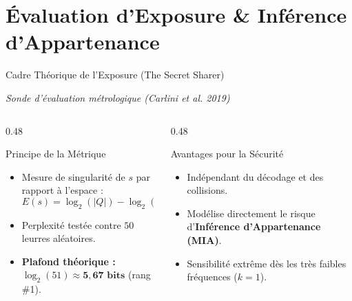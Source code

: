 \documentclass[aspectratio=169, 10pt, table]{beamer}
\newcommand{\subtitleline}[1]{{\small\itshape\color{TSPcyan}#1\par}\vspace{0.15cm}}
\begin{document}
\section{Évaluation d'Exposure \& Inférence d'Appartenance}

\begin{frame}{Cadre Théorique de l'Exposure (The Secret Sharer)}
    \subtitleline{Sonde d'évaluation métrologique (Carlini et al. 2019)}
    \begin{columns}[T]
        \begin{column}{0.48\textwidth}
            \begin{block}{Principe de la Métrique}
                \small
                \begin{itemize}
                    \item Mesure de singularité de $s$ par rapport à l'espace :
                    $$E(s) = \log_2(|Q|) - \log_2(\text{Rang}(s))$$
                    \item Perplexité testée contre $50$ leurres aléatoires.
                    \item \textbf{Plafond théorique :} $\log_2(51) \approx \mathbf{5{,}67\text{ bits}}$ (rang \#1).
                \end{itemize}
            \end{block}
        \end{column}
        \begin{column}{0.48\textwidth}
            \begin{block}{Avantages pour la Sécurité}
                \small
                \begin{itemize}
                    \item Indépendant du décodage et des collisions.
                    \item Modélise directement le risque d'\textbf{Inférence d'Appartenance (MIA)}.
                    \item Sensibilité extrême dès les très faibles fréquences ($k=1$).
                \end{itemize}
            \end{block}
        \end{column}
    \end{columns}
\end{frame}
\end{document}
